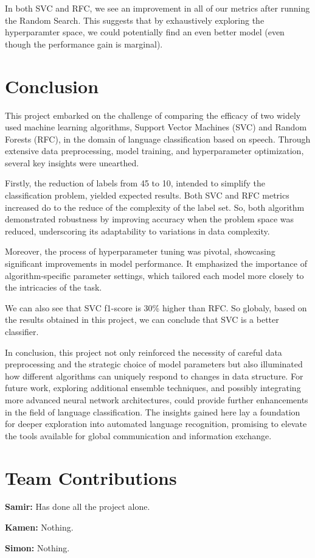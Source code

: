 \documentclass[twocolumn]{article}
\begin{document}
In both SVC and RFC, we see an improvement in all of our metrics after running the Random Search. This suggests that by exhaustively exploring the hyperparamter space, we could potentially find an even better model (even though the performance gain is marginal).  

\section{Conclusion}
This project embarked on the challenge of comparing the efficacy of two widely used machine learning algorithms, Support Vector Machines (SVC) and Random Forests (RFC), in the domain of language classification based on speech. Through extensive data preprocessing, model training, and hyperparameter optimization, several key insights were unearthed.

Firstly, the reduction of labels from 45 to 10, intended to simplify the classification problem, yielded expected results. Both SVC and RFC metrics increased do to the reduce of the complexity of the label set. So, both algorithm demonstrated robustness by improving accuracy when the problem space was reduced, underscoring its adaptability to variations in data complexity.

Moreover, the process of hyperparameter tuning was pivotal, showcasing significant improvements in model performance. It emphasized the importance of algorithm-specific parameter settings, which tailored each model more closely to the intricacies of the task.

We can also see that SVC f1-score is 30\% higher than RFC. So globaly, based on the results obtained in this project, we can conclude that SVC is a better classifier.

In conclusion, this project not only reinforced the necessity of careful data preprocessing and the strategic choice of model parameters but also illuminated how different algorithms can uniquely respond to changes in data structure. For future work, exploring additional ensemble techniques, and possibly integrating more advanced neural network architectures, could provide further enhancements in the field of language classification. The insights gained here lay a foundation for deeper exploration into automated language recognition, promising to elevate the tools available for global communication and information exchange.

\section{Team Contributions}
\textbf{Samir:} Has done all the project alone.

\textbf{Kamen:} Nothing.

\textbf{Simon:} Nothing.
\end{document}
